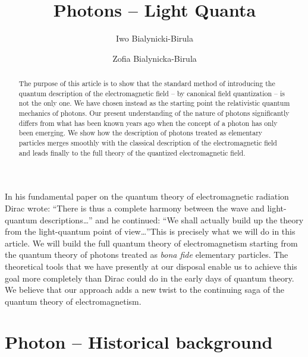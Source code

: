 \documentclass[twocolumn,aps,pra,10pt]{revtex4-1}
\begin{document}
\title{Photons -- Light Quanta}
\author{Iwo Bialynicki-Birula}
\author{Zofia Bialynicka-Birula}

\begin{abstract}
The purpose of this article is to show that the standard method of introducing the quantum description of the electromagnetic field -- by canonical field quantization -- is not the only one. We have chosen instead as the starting point the relativistic quantum mechanics of photons. Our present understanding of the nature of photons significantly differs from what has been known years ago when the concept of a photon has only been emerging. We show how the description of photons treated as elementary particles merges smoothly with the classical description of the electromagnetic field and leads finally to the full theory of the quantized electromagnetic field.
\end{abstract}

\maketitle
In his fundamental paper \cite{pamd} on the quantum theory of electromagnetic radiation Dirac wrote:
``There is thus a complete harmony between the wave and light-quantum descriptions\dots'' and he continued:
``We shall actually build up the theory from the light-quantum point of view\dots''This is precisely what we will do in this article. We will build the full quantum theory of electromagnetism starting from the quantum theory of photons treated as {\em bona fide} elementary particles. The theoretical tools that we have presently at our disposal enable us to achieve this goal more completely than Dirac could do in the early days of quantum theory. We believe that our approach adds a new twist to the continuing saga of the quantum theory of electromagnetism.

\section{Photon -- Historical background}
\end{document}
